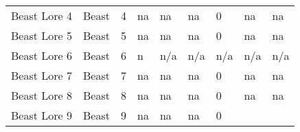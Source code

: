 \documentclass[twoside]{book}
\begin{document}
\begin{longtable}{p{1.25in}lp{2em}p{3em}llp{7em}ll}
  \raggedright
           Beast Lore 4 
  &
   Beast 
  &
   4 
  &
  
           na 
  &
   na
           
  &
   na
           
  &
   0
           
  &
   na
           
  &
   na
           
  \tabularnewline
      
  \raggedright
           Beast Lore 5 
  &
   Beast 
  &
   5 
  &
  
           na 
  &
   na
           
  &
   na
           
  &
   0
           
  &
   na
           
  &
   na
           
  \tabularnewline
      
  \raggedright
           Beast Lore 6 
  &
   Beast 
  &
   6 
  &
   n
           
  &
   n/a 
  &
   n/a 
  &
   n/a
           
  &
   n/a 
  &
   n/a 
  \tabularnewline
      
  \raggedright
           Beast Lore 7 
  &
   Beast 
  &
   7 
  &
  
           na 
  &
   na
           
  &
   na
           
  &
   0
           
  &
   na
           
  &
   na
           
  \tabularnewline
      
  \raggedright
           Beast Lore 8 
  &
   Beast 
  &
   8 
  &
  
           na 
  &
   na
           
  &
   na
           
  &
   0
           
  &
   na
           
  &
   na
           
  \tabularnewline
      
  \raggedright
           Beast Lore 9 
  &
   Beast 
  &
   9 
  &
  
           na 
  &
   na
           
  &
   na
           
  &
   0
           

\end{longtable}
\end{document}
